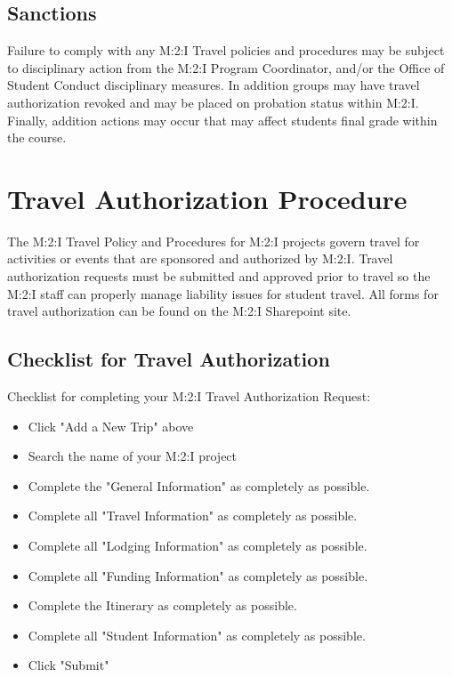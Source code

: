 {\section{Sanctions}
Failure to comply with any M:2:I Travel policies and procedures may be subject to disciplinary action from the M:2:I Program Coordinator, and/or the Office of Student Conduct disciplinary measures. In addition groups may have travel authorization revoked and may be placed on probation status within M:2:I.  Finally, addition actions may occur that may affect students final grade within the course.

\chapter{Travel Authorization Procedure}

The M:2:I Travel Policy and Procedures for M:2:I projects govern travel for activities or events that are sponsored and authorized by M:2:I.  Travel authorization requests must be submitted and approved prior to travel so the M:2:I staff can properly manage liability issues for student travel.  All forms for travel authorization can be found on the M:2:I Sharepoint site.

\section{Checklist for Travel Authorization}

Checklist for completing your M:2:I Travel Authorization Request:

\begin{itemize}[label={\checkmark}]
\item Click "Add a New Trip" above
\item Search the name of your M:2:I project
\item Complete the "General Information" as completely as possible.
\item Complete all "Travel Information" as completely as possible.
\item Complete all "Lodging Information" as completely as possible.
\item Complete all "Funding Information" as completely as possible.
\item Complete the Itinerary as completely as possible.
\item Complete all "Student Information" as completely as possible.
\item Click "Submit"
\end{itemize}

}
